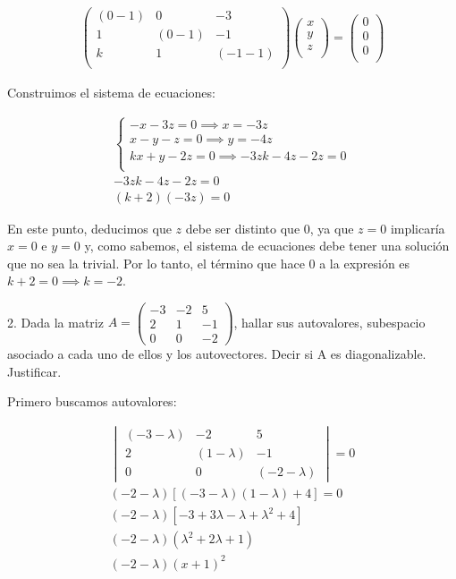 \documentclass[12pt]{article}
\begin{document}
\begin{align*}
	\begin{pmatrix}
		(0-1) & 0     & -3     \\
		1     & (0-1) & -1     \\
		k     & 1     & (-1-1) \\
	\end{pmatrix}
	\begin{pmatrix}
		x \\
		y \\
		z \\
	\end{pmatrix} =
	\begin{pmatrix}
		0 \\
		0 \\
		0 \\
	\end{pmatrix}
\end{align*}

Construimos el sistema de ecuaciones:

\begin{align*}
	\begin{cases}
		-x-3z=0 \implies x=-3z          \\
		x-y-z=0 \implies y=-4z          \\
		kx+y-2z=0 \implies -3zk-4z-2z=0 \\
	\end{cases} \\
	-3zk-4z-2z=0                    \\
	(k+2)(-3z)=0
\end{align*}

En este punto, deducimos que \(z\) debe ser distinto que 0,
ya que \(z = 0\) implicaría \(x=0\) e \(y=0\) y,
como sabemos,
el sistema de ecuaciones debe tener una solución que no sea
la trivial. Por lo tanto, el término que hace 0 a la expresión es
\(k+2=0 \implies \boxed{k=-2}\).

\pagebreak

2. Dada la matriz \(A=\begin{pmatrix}
	-3 & -2 & 5 \\2&1&-1\\0&0&-2
\end{pmatrix}\), hallar sus autovalores,
subespacio asociado a cada uno de ellos y los autovectores.
Decir si A es diagonalizable. Justificar.

Primero buscamos autovalores:

\begin{align*}
	\begin{vmatrix}
		(-3-\lambda) & -2          & 5            \\
		2            & (1-\lambda) & -1           \\
		0            & 0           & (-2-\lambda)
	\end{vmatrix} = 0       \\
	(-2-\lambda)[(-3-\lambda)(1-\lambda)+4]=0       \\
	(-2-\lambda)[-3+3\lambda-\lambda+\lambda^{2}+4] \\
	(-2-\lambda)(\lambda^{2}+2\lambda+1)            \\
	(-2-\lambda)(x+1)^{2}
\end{align*}
\end{document}
